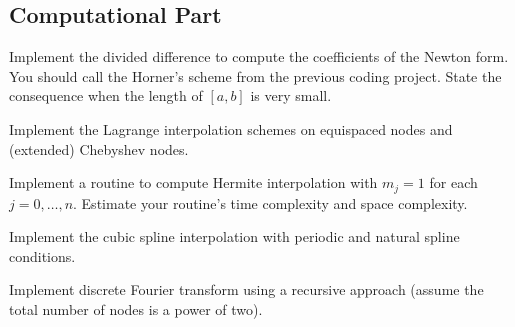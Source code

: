 \subsection{Computational Part}
\begin{problem}
    Implement the divided difference to compute the coefficients of the Newton form. You should call the Horner's scheme from the previous coding project. State the consequence when the length of $[a, b]$ is very small. 
\end{problem}
\begin{problem}
    Implement the Lagrange interpolation schemes on equispaced nodes and (extended) Chebyshev nodes.
\end{problem}
\begin{problem}
    Implement a routine to compute Hermite interpolation with $m_j = 1$ for each $j = 0, \dots, n$. Estimate your routine's time complexity and space complexity. 
\end{problem}
\begin{problem}
    Implement the cubic spline interpolation with periodic and natural spline conditions. 
\end{problem}

\begin{problem}
     Implement discrete Fourier transform using a recursive approach (assume the total number of nodes is a power of two).
\end{problem}

% 
\nocite{jackson1912approximation, jackson1913accuracy, erdHos1964problems,erdos1958problems,de1978practical,prenter2008splines}


